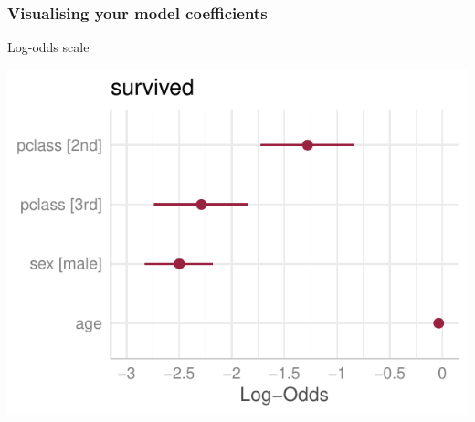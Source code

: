 \documentclass[a4paper]{article}
\begin{document}
\subsubsection{Visualising your model coefficients}
\begin{minipage}[t]{0.49\textwidth}
Log-odds scale
\begin{Schunk}


{\centering \includegraphics[width=\maxwidth]{figure/listings-unnamed-chunk-416-1} 

}

\end{Schunk}
\end{minipage}
\hspace{0.02\textwidth}
\end{document}

